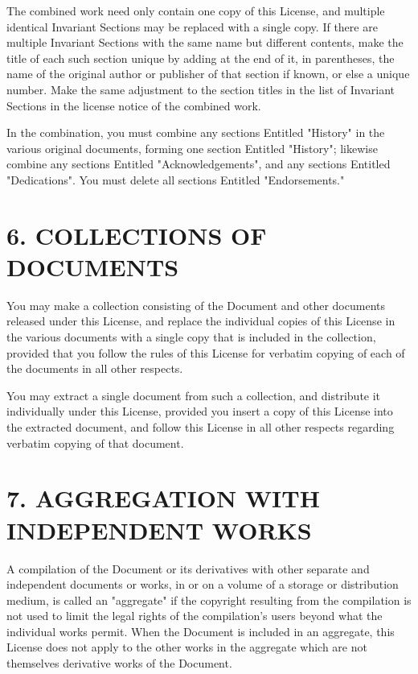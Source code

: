 \documentclass{book}
\begin{document}
The combined work need only contain one copy of this License, and
multiple identical Invariant Sections may be replaced with a single
copy. If there are multiple Invariant Sections with the same name but
different contents, make the title of each such section unique by
adding at the end of it, in parentheses, the name of the original
author or publisher of that section if known, or else a unique number.
Make the same adjustment to the section titles in the list of
Invariant Sections in the license notice of the combined work.

In the combination, you must combine any sections Entitled "History"
in the various original documents, forming one section Entitled
"History"; likewise combine any sections Entitled "Acknowledgements",
and any sections Entitled "Dedications". You must delete all sections
Entitled "Endorsements."

\section*{6. COLLECTIONS OF DOCUMENTS}

You may make a collection consisting of the Document and other
documents released under this License, and replace the individual
copies of this License in the various documents with a single copy
that is included in the collection, provided that you follow the rules
of this License for verbatim copying of each of the documents in all
other respects.

You may extract a single document from such a collection, and
distribute it individually under this License, provided you insert a
copy of this License into the extracted document, and follow this
License in all other respects regarding verbatim copying of that
document.

\section*{7. AGGREGATION WITH INDEPENDENT WORKS}

A compilation of the Document or its derivatives with other separate
and independent documents or works, in or on a volume of a storage or
distribution medium, is called an "aggregate" if the copyright
resulting from the compilation is not used to limit the legal rights
of the compilation's users beyond what the individual works permit.
When the Document is included in an aggregate, this License does not
apply to the other works in the aggregate which are not themselves
derivative works of the Document.
\end{document}
